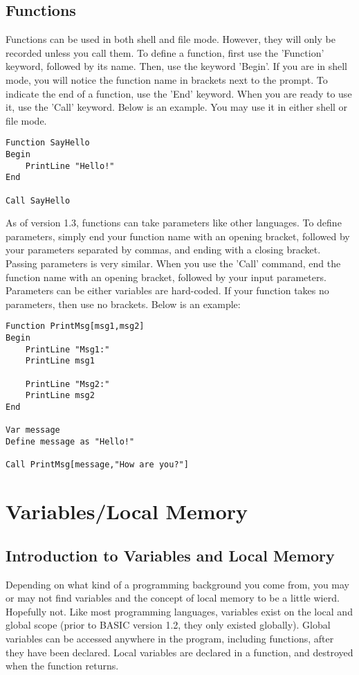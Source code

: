 \documentclass{report}
\begin{document}
\section{Functions}

Functions can be used in both shell and file mode. However, they will only be recorded unless you call them. To define a function, first use the 'Function' keyword, followed by its name. Then, use the keyword 'Begin'. If you are in shell mode, you will notice the function name in brackets next to the prompt. To indicate the end of a function, use the 'End' keyword. When you are ready to use it, use the 'Call' keyword. Below is an example. You may use it in either shell or file mode.

\begin{lstlisting}
Function SayHello
Begin
	PrintLine "Hello!"
End

Call SayHello
\end{lstlisting}

As of version 1.3, functions can take parameters like other languages. To define parameters, simply end your function name with an opening bracket, followed by your parameters separated by commas, and ending with a closing bracket. Passing parameters is very similar. When you use the 'Call' command, end the function name with an opening bracket, followed by your input parameters. Parameters can be either variables are hard-coded. If your function takes no parameters, then use no brackets. Below is an example:

\begin{lstlisting}
Function PrintMsg[msg1,msg2]
Begin
	PrintLine "Msg1:"
	PrintLine msg1
	
	PrintLine "Msg2:"
	PrintLine msg2
End

Var message
Define message as "Hello!"

Call PrintMsg[message,"How are you?"]
\end{lstlisting}

\chapter{Variables/Local Memory}

\section{Introduction to Variables and Local Memory}

Depending on what kind of a programming background you come from, you may or may not find variables and the concept of local memory to be a little wierd. Hopefully not. Like most programming languages, variables exist on the local and global scope (prior to BASIC version 1.2, they only existed globally). Global variables can be accessed anywhere in the program, including functions, after they have been declared. Local variables are declared in a function, and destroyed when the function returns.
\end{document}
